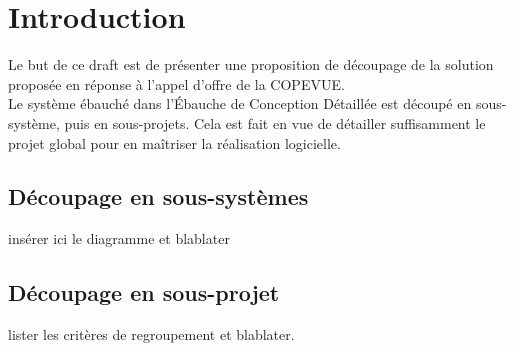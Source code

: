 \section{Introduction}

Le but de ce draft est de présenter une proposition de découpage de la
solution proposée en réponse à l'appel d'offre de la COPEVUE.\\
Le système ébauché dans l'Ébauche de Conception Détaillée est découpé en
sous-système, puis en sous-projets. Cela est fait en vue de détailler
suffisamment le projet global pour en maîtriser la réalisation logicielle.

\subsection{Découpage en sous-systèmes}

insérer ici le diagramme et blablater

\subsection{Découpage en sous-projet}

lister les critères de regroupement et blablater.
